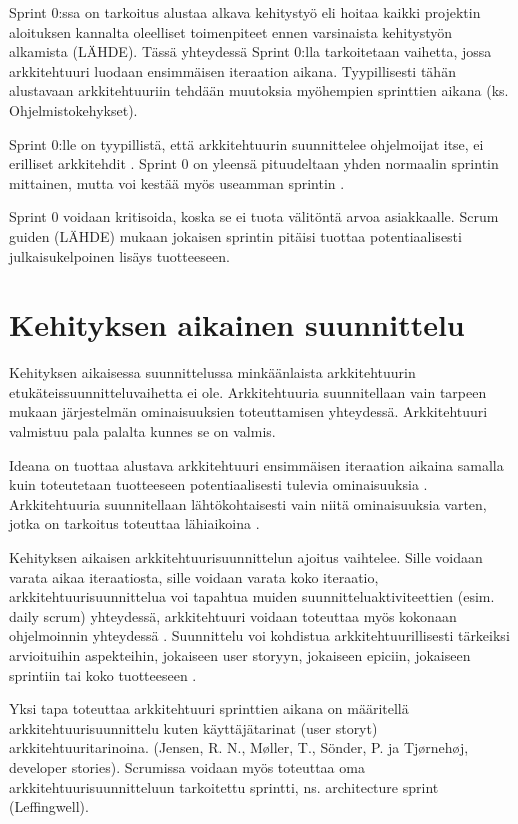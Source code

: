 Sprint 0:ssa on tarkoitus alustaa alkava kehitystyö eli hoitaa kaikki projektin aloituksen kannalta oleelliset toimenpiteet ennen varsinaista kehitystyön alkamista (LÄHDE). Tässä yhteydessä Sprint 0:lla tarkoitetaan vaihetta, jossa arkkitehtuuri luodaan ensimmäisen iteraation aikana. Tyypillisesti tähän alustavaan arkkitehtuuriin tehdään muutoksia myöhempien sprinttien aikana (ks. Ohjelmistokehykset). 

Sprint 0:lle on tyypillistä, että arkkitehtuurin suunnittelee ohjelmoijat itse, ei erilliset arkkitehdit \citep{eloranta2015techniques}. Sprint 0 on yleensä pituudeltaan yhden normaalin sprintin mittainen, mutta voi kestää myös useamman sprintin \citep{prause_architectural_2012}.

Sprint 0 voidaan kritisoida, koska se ei tuota välitöntä arvoa asiakkaalle.
Scrum guiden (LÄHDE) mukaan jokaisen sprintin pitäisi tuottaa potentiaalisesti julkaisukelpoinen lisäys tuotteeseen.

\section{Kehityksen aikainen suunnittelu}
Kehityksen aikaisessa suunnittelussa minkäänlaista arkkitehtuurin etukäteissuunnitteluvaihetta ei ole. Arkkitehtuuria suunnitellaan vain tarpeen mukaan järjestelmän ominaisuuksien toteuttamisen yhteydessä. Arkkitehtuuri valmistuu pala palalta kunnes se on valmis.

Ideana on tuottaa alustava arkkitehtuuri ensimmäisen iteraation aikaina samalla kuin toteutetaan tuotteeseen potentiaalisesti tulevia ominaisuuksia \citep{eloranta2015techniques}. Arkkitehtuuria suunnitellaan lähtökohtaisesti vain niitä ominaisuuksia varten, jotka on tarkoitus toteuttaa lähiaikoina \citep{waterman_how_2015}. 

Kehityksen aikaisen arkkitehtuurisuunnittelun ajoitus vaihtelee.
Sille voidaan varata aikaa iteraatiosta, sille voidaan varata koko iteraatio, arkkitehtuurisuunnittelua voi tapahtua muiden suunnitteluaktiviteettien (esim. daily scrum) yhteydessä, arkkitehtuuri voidaan toteuttaa myös kokonaan ohjelmoinnin yhteydessä \citep{rost_distilling_2015}. Suunnittelu voi kohdistua arkkitehtuurillisesti tärkeiksi arvioituihin aspekteihin, jokaiseen user storyyn, jokaiseen epiciin, jokaiseen sprintiin tai koko tuotteeseen \citep{rost_distilling_2015}.


Yksi tapa toteuttaa arkkitehtuuri sprinttien aikana on määritellä arkkitehtuurisuunnittelu kuten käyttäjätarinat (user storyt) arkkitehtuuritarinoina. (Jensen, R. N., Møller, T., Sönder, P. ja Tjørnehøj, developer stories). Scrumissa voidaan myös toteuttaa oma arkkitehtuurisuunnitteluun tarkoitettu sprintti, ns. architecture sprint (Leffingwell). 

